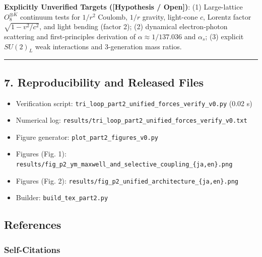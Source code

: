 \documentclass[
  a4paper,
]{article}
\providecommand{\tightlist}{%
  \setlength{\itemsep}{0pt}\setlength{\parskip}{0pt}}
\begin{document}
\textbf{Explicitly Unverified Targets ({[}Hypothesis / Open{]})}: (1)
Large-lattice \(O_8^{\otimes K}\) continuum tests for \(1/r^2\) Coulomb,
\(1/r\) gravity, light-cone \(c\), Lorentz factor \(\sqrt{1-v^2/c^2}\),
and light bending (factor 2); (2) dynamical electron-photon scattering
and first-principles derivation of \(\alpha \approx 1/137.036\) and
\(\alpha_s\); (3) explicit \(SU(2)_L\) weak interactions and
3-generation mass ratios.

\begin{center}\rule{0.5\linewidth}{0.5pt}\end{center}

\subsection{7. Reproducibility and Released
Files}\label{reproducibility-and-released-files}

\begin{itemize}
\tightlist
\item
  Verification script:
  \texttt{tri\_loop\_part2\_unified\_forces\_verify\_v0.py} (0.02 s)
\item
  Numerical log:
  \texttt{results/tri\_loop\_part2\_unified\_forces\_verify\_v0.txt}
\item
  Figure generator: \texttt{plot\_part2\_figures\_v0.py}
\item
  Figures (Fig. 1):
  \texttt{results/fig\_p2\_ym\_maxwell\_and\_selective\_coupling\_\{ja,en\}.png}
\item
  Figures (Fig. 2):
  \texttt{results/fig\_p2\_unified\_architecture\_\{ja,en\}.png}
\item
  Builder: \texttt{build\_tex\_part2.py}
\end{itemize}

\subsection{References}\label{references}

\subsubsection{Self-Citations}\label{self-citations}
\end{document}
